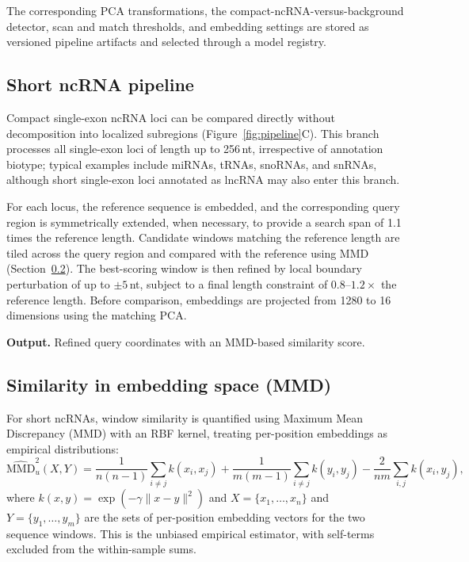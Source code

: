 The corresponding PCA transformations, the compact-ncRNA-versus-background
detector, scan and match thresholds, and embedding settings are stored as
versioned pipeline artifacts and selected through a model registry.

\subsection{Short ncRNA pipeline}
\label{sec:short}

Compact single-exon ncRNA loci can be compared directly without decomposition
into localized subregions (Figure~\ref{fig:pipeline}C). This branch processes all
single-exon loci of length up to 256\,nt, irrespective of annotation biotype;
typical examples include miRNAs, tRNAs, snoRNAs, and snRNAs, although short
single-exon loci annotated as lncRNA may also enter this branch.

For each locus, the reference sequence is embedded, and the corresponding query
region is symmetrically extended, when necessary, to provide a search span of
1.1 times the reference length. Candidate windows matching the reference length
are tiled across the query region and compared with the reference using MMD
(Section~\ref{sec:mmd}). The best-scoring window is then refined by local boundary
perturbation of up to $\pm 5$\,nt, subject to a final length constraint of
$0.8$--$1.2\times$ the reference length. Before comparison, embeddings are
projected from 1280 to 16 dimensions using the matching PCA.

\textbf{Output.} Refined query coordinates with an MMD-based similarity score.

\subsection{Similarity in embedding space (MMD)}
\label{sec:mmd}

For short ncRNAs, window similarity is quantified using Maximum Mean Discrepancy
(MMD) \citep{grettonKernelTwoSampleTest2012} with an RBF kernel, treating
per-position embeddings as empirical distributions:
\begin{equation}
    \widehat{\mathrm{MMD}}_u^2(X, Y) =
    \frac{1}{n(n-1)}\sum_{i \neq j} k(x_i, x_j)
    + \frac{1}{m(m-1)}\sum_{i \neq j} k(y_i, y_j)
    - \frac{2}{nm}\sum_{i,j} k(x_i, y_j),
\end{equation}
where $k(x, y) = \exp(-\gamma \lVert x - y \rVert^2)$ and
$X = \{x_1, \dots, x_n\}$ and $Y = \{y_1, \dots, y_m\}$ are the sets of
per-position embedding vectors for the two sequence windows. This is the
unbiased empirical estimator, with self-terms excluded from the within-sample
sums.

